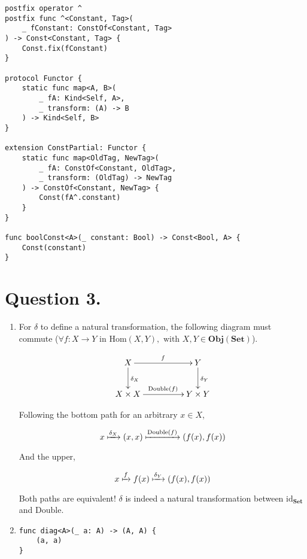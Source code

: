 \documentclass{article}
\begin{document}
\begin{enumerate}[label=(\alph*)]
\begin{verbatim}
postfix operator ^
postfix func ^<Constant, Tag>(
	_ fConstant: ConstOf<Constant, Tag>
) -> Const<Constant, Tag> {
	Const.fix(fConstant)
}

protocol Functor {
	static func map<A, B>(
		_ fA: Kind<Self, A>,
		_ transform: (A) -> B
	) -> Kind<Self, B>
}

extension ConstPartial: Functor {
	static func map<OldTag, NewTag>(
		_ fA: ConstOf<Constant, OldTag>,
		_ transform: (OldTag) -> NewTag
	) -> ConstOf<Constant, NewTag> {
		Const(fA^.constant)
	}
}

func boolConst<A>(_ constant: Bool) -> Const<Bool, A> {
	Const(constant)
}
\end{verbatim}

\end{enumerate}

\section*{Question 3.}

\begin{enumerate}[label=(\alph*)]

\item For $\delta$ to define a natural transformation, the following diagram must commute ($\forall f: X \rightarrow Y$ in $\textrm{Hom}(X, Y), \textrm{ with } X, Y \in \textbf{Obj}(\textbf{Set})$).

\[\xymatrixcolsep{4pc}\xymatrix{
X \ar[d]^{\delta_X} \ar[r]^f &Y\ar[d]^{\delta_Y}\\
X \times X \ar[r]^{\textrm{Double}(f)}          &Y \times Y}
\]

Following the bottom path for an arbitrary $x \in X$,

\[x \xmapsto{\delta_X} (x, x) \xmapsto{\textrm{Double}(f)} (f(x), f(x))\]

And the upper,

\[x \xmapsto{f} f(x) \xmapsto{\delta_Y} (f(x), f(x))\]

Both paths are equivalent! $\delta$ is indeed a natural transformation between $\textrm{id}_{\textbf{Set}}$ and $\textrm{Double}$.

\item

\begin{verbatim}
func diag<A>(_ a: A) -> (A, A) {
	(a, a)
}
\end{verbatim}

\end{enumerate}
\end{document}
